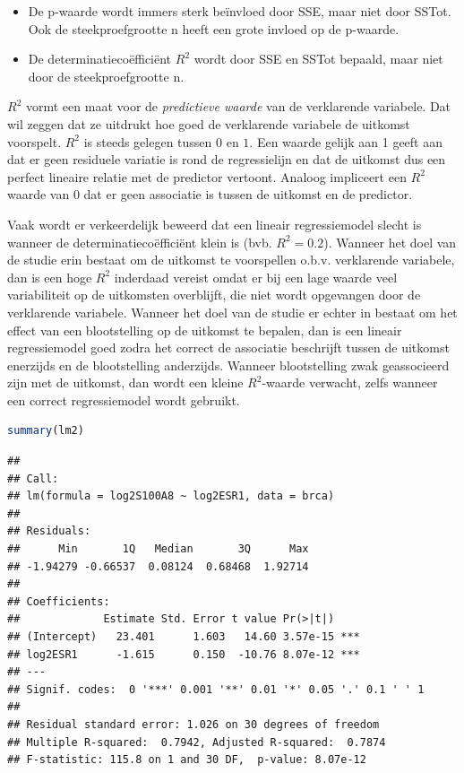 \documentclass[
  12pt,dutch,coursenotes]{book}
\providecommand{\tightlist}{%
  \setlength{\itemsep}{0pt}\setlength{\parskip}{0pt}}
\theoremstyle{definition}
\theoremstyle{definition}
\theoremstyle{definition}
\theoremstyle{definition}
\theoremstyle{remark}
\begin{document}
\begin{itemize}
\tightlist
\item
  De p-waarde wordt immers sterk beïnvloed door SSE, maar niet door SSTot. Ook de steekproefgrootte n heeft een grote invloed op de p-waarde.
\item
  De determinatiecoëfficiënt \(R^2\) wordt door SSE en SSTot bepaald, maar niet door de steekproefgrootte n.
\end{itemize}

\(R^2\) vormt een maat voor de \emph{predictieve waarde} van de verklarende variabele.
Dat wil zeggen dat ze uitdrukt hoe goed de verklarende variabele de uitkomst voorspelt.
\(R^2\) is steeds gelegen tussen \(0\) en \(1\). Een waarde gelijk aan 1 geeft aan dat er geen residuele variatie is rond de regressielijn en dat de
uitkomst dus een perfect lineaire relatie met de predictor vertoont. Analoog impliceert een \(R^2\) waarde van 0 dat er geen associatie is tussen de uitkomst en de predictor.

Vaak wordt er verkeerdelijk beweerd dat een lineair regressiemodel slecht is wanneer de determinatiecoëfficiënt klein is (bvb. \(R^2=0.2\)).
Wanneer het doel van de studie erin bestaat om de uitkomst te voorspellen o.b.v. verklarende variabele, dan is een hoge \(R^2\) inderdaad vereist omdat er bij een lage waarde veel variabiliteit op de uitkomsten overblijft, die niet wordt opgevangen door de verklarende variabele. Wanneer het doel van de studie er echter in bestaat om het effect van een blootstelling op de uitkomst te bepalen, dan is een lineair regressiemodel goed zodra het correct de associatie beschrijft tussen de uitkomst enerzijds en de blootstelling anderzijds.
Wanneer blootstelling zwak geassocieerd zijn met de uitkomst, dan wordt een kleine \(R^2\)-waarde verwacht, zelfs wanneer een correct regressiemodel wordt gebruikt.

\begin{lstlisting}[language=R]
summary(lm2)
\end{lstlisting}

\begin{lstlisting}
## 
## Call:
## lm(formula = log2S100A8 ~ log2ESR1, data = brca)
## 
## Residuals:
##      Min       1Q   Median       3Q      Max 
## -1.94279 -0.66537  0.08124  0.68468  1.92714 
## 
## Coefficients:
##             Estimate Std. Error t value Pr(>|t|)    
## (Intercept)   23.401      1.603   14.60 3.57e-15 ***
## log2ESR1      -1.615      0.150  -10.76 8.07e-12 ***
## ---
## Signif. codes:  0 '***' 0.001 '**' 0.01 '*' 0.05 '.' 0.1 ' ' 1
## 
## Residual standard error: 1.026 on 30 degrees of freedom
## Multiple R-squared:  0.7942, Adjusted R-squared:  0.7874 
## F-statistic: 115.8 on 1 and 30 DF,  p-value: 8.07e-12
\end{lstlisting}
\end{document}
